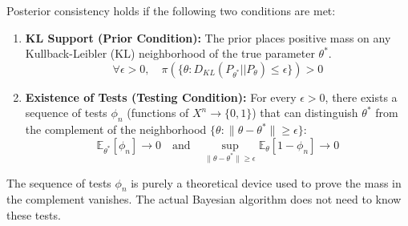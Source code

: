 \begin{thm}[Schwartz]
Posterior consistency holds if the following two conditions are met:
\begin{enumerate}
    \item \textbf{KL Support (Prior Condition):} The prior places positive mass on any Kullback-Leibler (KL) neighborhood of the true parameter $\theta^*$.
    $$
    \forall \epsilon > 0, \quad \pi(\{\theta : D_{KL}(P_{\theta^*} || P_\theta) \le \epsilon\}) > 0
    $$
    \item \textbf{Existence of Tests (Testing Condition):} For every $\epsilon > 0$, there exists a sequence of tests $\phi_n$ (functions of $X^n \to \{0,1\}$) that can distinguish $\theta^*$ from the complement of the neighborhood $\{\theta : \|\theta - \theta^*\| \ge \epsilon\}$:
    $$
    \mathbb{E}_{\theta^*}[\phi_n] \to 0 \quad \text{and} \quad \sup_{\|\theta - \theta^*\| \ge \epsilon} \mathbb{E}_\theta[1 - \phi_n] \to 0
    $$
\end{enumerate}
\end{thm}

\begin{remark}
The sequence of tests $\phi_n$ is purely a theoretical device used to prove the mass in the complement vanishes. The actual Bayesian algorithm does not need to know these tests.
\end{remark}

